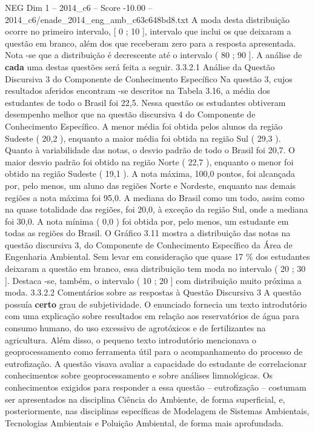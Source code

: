 \begin{textsample}{NEG Dim 1 – 2014\_c6 – Score -10.00 – 2014\_c6/enade\_2014\_eng\_amb\_c63c648bd8.txt}
A moda desta distribuição ocorre no primeiro intervalo, [ 0 ; 10 ], intervalo que inclui os que deixaram a questão em branco, além dos que receberam zero para a resposta apresentada.
Nota -se que a distribuição é decrescente até o intervalo ( 80 ; 90 ].
A análise de \textbf{cada} uma destas questões será feita a seguir. 3.3.2.1 Análise da Questão Discursiva 3 do Componente de Conhecimento Específico Na questão 3, cujos resultados aferidos encontram -se descritos na Tabela 3.16, a média dos estudantes de todo o Brasil foi 22,5.
Nessa questão os estudantes obtiveram desempenho melhor que na questão discursiva 4 do Componente de Conhecimento Específico.
A menor média foi obtida pelos alunos da região Sudeste ( 20,2 ), enquanto a maior média foi obtida na região Sul ( 29,3 ).
Quanto à variabilidade das notas, o desvio padrão de todo o Brasil foi 20,7.
O maior desvio padrão foi obtido na região Norte ( 22,7 ), enquanto o menor foi obtido na região Sudeste ( 19,1 ).
A nota máxima, 100,0 pontos, foi alcançada por, pelo menos, um aluno das regiões Norte e Nordeste, enquanto nas demais regiões a nota máxima foi 95,0.
A mediana do Brasil como um todo, assim como na quase totalidade das regiões, foi 20,0, à exceção da região Sul, onde a mediana foi 30,0.
A nota mínima ( 0,0 ) foi obtida por, pelo menos, um estudante em todas as regiões do Brasil.
O Gráfico 3.11 mostra a distribuição das notas na questão discursiva 3, do Componente de Conhecimento Específico da Área de Engenharia Ambiental.
Sem levar em consideração que quase 17 \% dos estudantes deixaram a questão em branco, essa distribuição tem moda no intervalo ( 20 ; 30 ].
Destaca -se, também, o intervalo ( 10 ; 20 ] com distribuição muito próxima a moda. 3.3.2.2 Comentários sobre as respostas à Questão Discursiva 3 A questão possuía \textbf{certo} grau de subjetividade.
O enunciado fornecia um texto introdutório com uma explicação sobre resultados em relação aos reservatórios de água para consumo humano, do uso excessivo de agrotóxicos e de fertilizantes na agricultura.
Além disso, o pequeno texto introdutório mencionava o geoprocessamento como ferramenta útil para o acompanhamento do processo de eutrofização.
A questão visava avaliar a capacidade do estudante de correlacionar conhecimentos sobre geoprocessamento e sobre análises limnológicas.
Os conhecimentos exigidos para responder a essa questão – eutrofização – costumam ser apresentados na disciplina Ciência do Ambiente, de forma superficial, e, posteriormente, nas disciplinas específicas de Modelagem de Sistemas Ambientais, Tecnologias Ambientais e Poluição Ambiental, de forma mais aprofundada.

\end{textsample}
